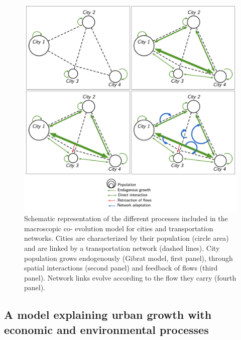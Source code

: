 \documentclass[10pt,letterpaper]{article}
\begin{document}
\begin{figure}
	\includegraphics[width=\linewidth]{figures/Fig1.jpg}
	\caption{Schematic representation of the different processes included in the macroscopic co- evolution model for cities and transportation networks. Cities are characterized by their population (circle area) and are linked by a transportation network (dashed lines). City population grows endogenously (Gibrat model, first panel), through spatial interactions (second panel) and feedback of flows (third panel). Network links evolve according to the flow they carry (fourth panel).\label{fig:fig1}}	
\end{figure}




\subsection{A model explaining urban growth with economic and environmental processes}
\end{document}
